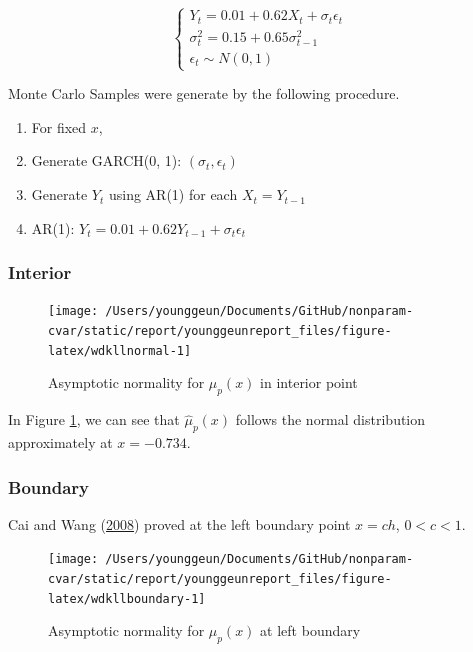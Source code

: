 \documentclass[
]{article}
\providecommand{\tightlist}{%
  \setlength{\itemsep}{0pt}\setlength{\parskip}{0pt}}
\theoremstyle{definition}
\theoremstyle{definition}
\theoremstyle{definition}
\theoremstyle{remark}
\begin{document}
\[
\begin{cases}
  Y_t = 0.01 + 0.62 X_t + \sigma_t \epsilon_t \\
  \sigma_t^2 = 0.15 + 0.65 \sigma_{t - 1}^2 \\
  \epsilon_t \sim N(0, 1)
\end{cases}
\]

Monte Carlo Samples were generate by the following procedure.

\begin{enumerate}
\def\labelenumi{\arabic{enumi}.}
\tightlist
\item
  For fixed \(x\),
\item
  Generate GARCH(0, 1): \((\sigma_t, \epsilon_t)\)
\item
  Generate \(Y_t\) using AR(1) for each \(X_t = Y_{t - 1}\)
\item
  AR(1): \(Y_t = 0.01 + 0.62 Y_{t - 1} + \sigma_t \epsilon_t\)
\end{enumerate}

\hypertarget{interior}{%
\subsubsection{Interior}\label{interior}}

\begin{figure}[H]

{\centering \texttt{[image: /Users/younggeun/Documents/GitHub/nonparam-cvar/static/report/younggeunreport\_files/figure-latex/wdkllnormal-1]} 

}

\caption{Asymptotic normality for $\hat\mu_p(x)$ in interior point}\label{fig:wdkllnormal}
\end{figure}

In Figure \ref{fig:wdkllnormal}, we can see that \(\hat\mu_p(x)\) follows the normal distribution approximately at \(x = -0.734\).

\hypertarget{boundary}{%
\subsubsection{Boundary}\label{boundary}}

Cai and Wang (\protect\hyperlink{ref-cai:2008aa}{2008}) proved at the left boundary point \(x = ch\), \(0 < c < 1\).

\begin{figure}[H]

{\centering \texttt{[image: /Users/younggeun/Documents/GitHub/nonparam-cvar/static/report/younggeunreport\_files/figure-latex/wdkllboundary-1]} 

}

\caption{Asymptotic normality for $\hat\mu_p(x)$ at left boundary}\label{fig:wdkllboundary}
\end{figure}
\end{document}
